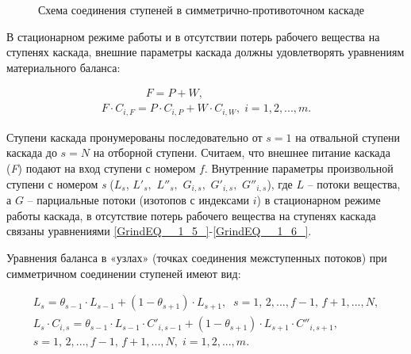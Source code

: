 \begin{figure}[ht]
  \caption{Схема соединения ступеней в симметрично-противоточном каскаде}\label{1_2}
\end{figure}

В стационарном режиме работы и в отсутствии потерь рабочего вещества на ступенях каскада, внешние параметры каскада должны удовлетворять уравнениям материального баланса:

\begin{equation} \label{GrindEQ__1_21_} 
  \begin{array}{l} {\quad \quad \quad \quad F=P+W,} \\ {F \cdot C_{i,F} =P \cdot C_{i,P} +W \cdot C_{i,W} ,\; i=1,2,...,m.} \end{array} 
\end{equation} 

Ступени каскада пронумерованы последовательно от $s=1$ на отвальной ступени каскада до $s=N$ на отборной ступени. Считаем, что внешнее питание каскада (\textit{F}) подают на вход ступени с номером $f$. Внутренние параметры произвольной ступени с номером \textit{s} ($L_{s} $, $L'_{s} ,$ $L''_{s} ,$ $G_{i,s} ,$ $G'_{i,s} ,$ $G''_{i,s} $), где $L$ -- потоки вещества, а $G$ -- парциальные потоки (изотопов с индексами $i$) в стационарном режиме работы каскада, в отсутствие потерь рабочего вещества на ступенях каскада связаны уравнениями \ref{GrindEQ__1_5_}-\ref{GrindEQ__1_6_}.

Уравнения баланса в «узлах» (точках соединения межступенных потоков) при симметричном соединении ступеней имеют вид:

\begin{equation} \label{GrindEQ__1_24_} 
  \begin{array}{l} {L_{s} =\theta _{s-1} \cdot L_{s-1} +(1-\theta _{s+1} ) \cdot L_{s+1} ,\; \; s=1,\, 2,...,f-1,\, f+1,...,N, } \\
    {L_{s} \cdot C_{i,s} =\theta _{s-1} \cdot L_{s-1} \cdot C'_{i,s-1} +(1-\theta _{s+1} ) \cdot L_{s+1} \cdot C''_{i,s+1} ,} \\
    {s=1,\, 2,...,f-1,\, f+1,...,N,\; i=1,2,...,m.}
  \end{array}   
\end{equation} 

